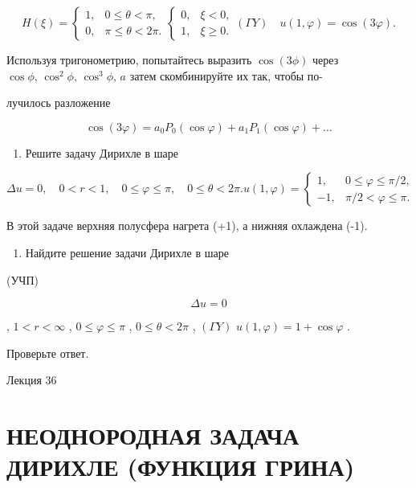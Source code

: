\documentclass[
  ukrainian,
]{article}
\providecommand{\tightlist}{%
  \setlength{\itemsep}{0pt}\setlength{\parskip}{0pt}}
\begin{document}
\[
H(\xi) =
\begin{cases} 1, & 0 \le \theta < \pi, \\ 0, & \pi \le \theta < 2\pi. \end{cases}
\begin{cases} 0, & \xi < 0, \\ 1, & \xi \geqslant 0. \end{cases}
(\Gamma Y)\quad u(1,\varphi)=\cos(3\varphi).
\]

Используя тригонометрию, попытайтесь выразить \(\cos{(3\phi)}\) через
\(\cos{\phi}, \, \cos^2{\phi}, \, \cos^3{\phi}, \, a\) затем
скомбинируйте их так, чтобы по-

лучилось разложение

\[
\cos(3\varphi) = a_0 P_0(\cos\varphi) + a_1 P_1(\cos\varphi) + \dots
\]

\begin{enumerate}
\def\labelenumi{\arabic{enumi}.}
\setcounter{enumi}{4}
\tightlist
\item
  Решите задачу Дирихле в шаре
\end{enumerate}

\[
\Delta u = 0, \quad 0 < r < 1, \quad 0 \le \varphi \le \pi, \quad 0 \le \theta < 2\pi.
u(1, \varphi) =
\begin{cases} 1, & 0 \le \varphi \le \pi/2, \\ -1, & \pi/2 < \varphi \le \pi. \end{cases}
\]

В этой задаче верхняя полусфера нагрета (+1), а нижняя охлаждена (-1).

\begin{enumerate}
\def\labelenumi{\arabic{enumi}.}
\setcounter{enumi}{5}
\tightlist
\item
  Найдите решение задачи Дирихле в шаре
\end{enumerate}

(УЧП)

\[
\Delta u = 0
\]

, \(1 < r < \infty\) , \(0 \le \varphi \le \pi\) ,
\(0 \le \theta < 2\pi\) , \((\Gamma Y)\)
\(u(1, \varphi) = 1 + \cos \varphi\) .

Проверьте ответ.

Лекция 36

\section{НЕОДНОРОДНАЯ ЗАДАЧА ДИРИХЛЕ (ФУНКЦИЯ
ГРИНА)}\label{ux43dux435ux43eux434ux43dux43eux440ux43eux434ux43dux430ux44f-ux437ux430ux434ux430ux447ux430-ux434ux438ux440ux438ux445ux43bux435-ux444ux443ux43dux43aux446ux438ux44f-ux433ux440ux438ux43dux430}
\end{document}
